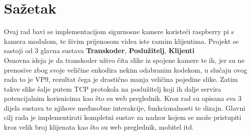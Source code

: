 \section*{Sažetak}
Ovaj rad bavi se implementacijom sigurnosne kamere koristeći raspberry pi s kamera modulom, 
te živim prijenosom videa iste raznim klijentima.
\paraBreak
Projekt se sastoji od 3 glavna sustava \textbf{Transkoder}, \textbf{Poslužitelj}, \textbf{Klijenti}
\\
Osnovna ideja je da transkoder uživo čita slike iz spojene kamere te ih,  jer su ne prenosive zbog svoje veličine enkodira
nekim odabranim kodekom, u slučaju ovog rada to je VP9, rezultat čega je drastično manja veličina pojedine slike. Zatim
takve slike šalje putem TCP protokola na poslužitelj koji ih dalje servira potencijalnim korisnicima kao što su web preglednik.
\paraBreak
Kroz rad su opisana sva 3 dijela sustava te njihove međusobne interakcije, funkcionalnosti te dizajn.
\paraBreak
Glavni cilj rada je implementirati kompletni sustav za nadzor kojem se može pristupiti kroz velik broj klijenata kao 
što su web preglednik, mobitel itd.

